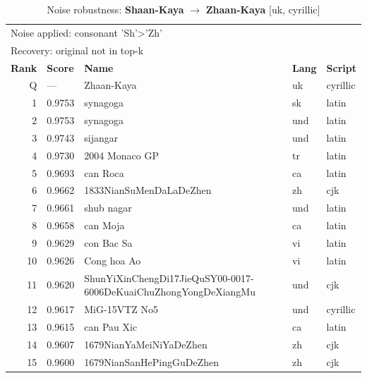 \begin{table}[htbp]
\centering
\small
\caption{Noise robustness: \textbf{Shaan-Kaya} $\rightarrow$ \textbf{Zhaan-Kaya} [uk, cyrillic]}
\label{tab:noise-3}
\begin{tabular}{rllll}
\toprule
\multicolumn{5}{l}{\small Noise applied: consonant 'Sh'>'Zh'} \\
\multicolumn{5}{l}{\small Recovery: original not in top-k} \\
\midrule
\textbf{Rank} & \textbf{Score} & \textbf{Name} & \textbf{Lang} & \textbf{Script} \\
\midrule
\rowcolor{gray!20} Q & --- & Zhaan-Kaya & uk & cyrillic \\
\midrule
1 & 0.9753 & synagoga & sk & latin \\
2 & 0.9753 & synagoga & und & latin \\
3 & 0.9743 & sijangar & und & latin \\
4 & 0.9730 & 2004 Monaco GP & tr & latin \\
5 & 0.9693 & can Roca & ca & latin \\
6 & 0.9662 & 1833NianSuMenDaLaDeZhen & zh & cjk \\
7 & 0.9661 & shub nagar & und & latin \\
8 & 0.9658 & can Moja & ca & latin \\
9 & 0.9629 & con Bac Sa & vi & latin \\
10 & 0.9626 & Cong hoa Ao & vi & latin \\
11 & 0.9620 & ShunYiXinChengDi17JieQuSY00-0017-6006DeKuaiChuZhongYongDeXiangMu & und & cjk \\
12 & 0.9617 & MiG-15VTZ No5 & und & cyrillic \\
13 & 0.9615 & can Pau Xic & ca & latin \\
14 & 0.9607 & 1679NianYaMeiNiYaDeZhen & zh & cjk \\
15 & 0.9600 & 1679NianSanHePingGuDeZhen & zh & cjk \\
\bottomrule
\end{tabular}
\end{table}

